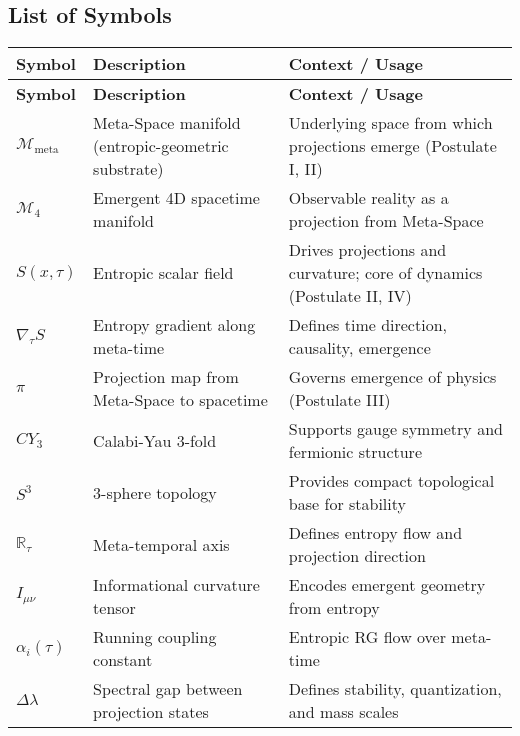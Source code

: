 \documentclass[10.5pt,a4paper]{article}
\begin{document}
\clearpage
{\small
\subsection{List of Symbols}
\begin{longtable}{p{4cm} p{7cm} p{6cm}}
\hline
\textbf{Symbol} & \textbf{Description} & \textbf{Context / Usage} \\
\hline
\endfirsthead
\hline
\textbf{Symbol} & \textbf{Description} & \textbf{Context / Usage} \\
\hline
\endhead

\( \mathcal{M}_{\mathrm{meta}} \) & Meta-Space manifold (entropic-geometric substrate) & Underlying space from which projections emerge (Postulate I, II) \\

\( \mathcal{M}_4 \) & Emergent 4D spacetime manifold & Observable reality as a projection from Meta-Space \\

\( S(x, \tau) \) & Entropic scalar field & Drives projections and curvature; core of dynamics (Postulate II, IV) \\

\( \nabla_\tau S \) & Entropy gradient along meta-time & Defines time direction, causality, emergence \\

\( \pi \) & Projection map from Meta-Space to spacetime & Governs emergence of physics (Postulate III) \\

\( CY_3 \) & Calabi-Yau 3-fold & Supports gauge symmetry and fermionic structure \\

\( S^3 \) & 3-sphere topology & Provides compact topological base for stability \\

\( \mathbb{R}_\tau \) & Meta-temporal axis & Defines entropy flow and projection direction \\

\( I_{\mu\nu} \) & Informational curvature tensor & Encodes emergent geometry from entropy \\

\( \alpha_i(\tau) \) & Running coupling constant & Entropic RG flow over meta-time \\

\( \Delta \lambda \) & Spectral gap between projection states & Defines stability, quantization, and mass scales \\


\end{longtable}}
\end{document}
